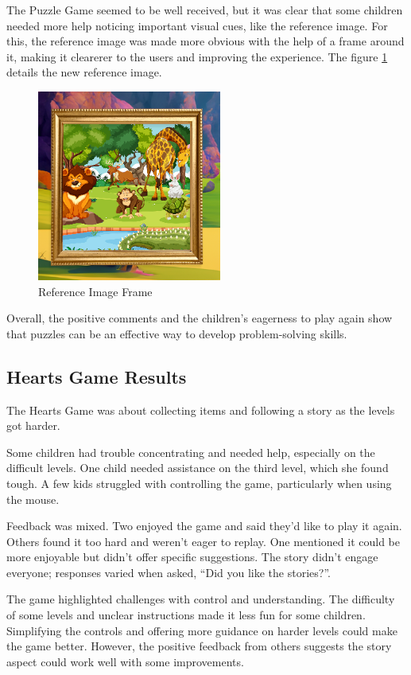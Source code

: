 The Puzzle Game seemed to be well received, but it was clear that some children needed more help noticing important visual cues, like the reference image. For this, the reference image was made more obvious with the help of a frame around it, making it clearerer to the users and improving the experience. The figure \ref{fig:puzzleRefImage} details the new reference image.

\begin{figure}[!h]
    \centering
    \includegraphics[width=0.3\linewidth]{Chapters/game_changes/puzzle-game-frame.png}
    \caption{Reference Image Frame}
    \label{fig:puzzleRefImage}
\end{figure}

Overall, the positive comments and the children’s eagerness to play again show that puzzles can be an effective way to develop problem-solving skills.

\subsection{Hearts Game Results}

The Hearts Game was about collecting items and following a story as the levels got harder.

Some children had trouble concentrating and needed help, especially on the difficult levels. One child needed assistance on the third level, which she found tough. A few kids struggled with controlling the game, particularly when using the mouse.

Feedback was mixed. Two enjoyed the game and said they’d like to play it again. Others found it too hard and weren’t eager to replay. One mentioned it could be more enjoyable but didn’t offer specific suggestions. The story didn’t engage everyone; responses varied when asked, “Did you like the stories?”.

The game highlighted challenges with control and understanding. The difficulty of some levels and unclear instructions made it less fun for some children. Simplifying the controls and offering more guidance on harder levels could make the game better. However, the positive feedback from others suggests the story aspect could work well with some improvements.

